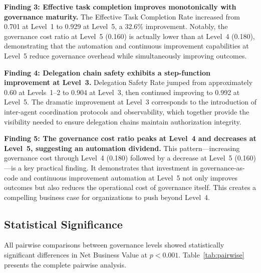 \documentclass[ai,article,submit,pdftex,moreauthors]{Definitions/mdpi}
\begin{document}
\textbf{Finding 3: Effective task completion improves monotonically with governance maturity.} The Effective Task Completion Rate increased from 0.701 at Level~1 to 0.929 at Level~5, a 32.6\% improvement. Notably, the governance cost ratio at Level~5 (0.160) is actually lower than at Level~4 (0.180), demonstrating that the automation and continuous improvement capabilities at Level~5 reduce governance overhead while simultaneously improving outcomes.

\textbf{Finding 4: Delegation chain safety exhibits a step-function improvement at Level~3.} Delegation Safety Rate jumped from approximately 0.60 at Levels~1--2 to 0.904 at Level~3, then continued improving to 0.992 at Level~5. The dramatic improvement at Level~3 corresponds to the introduction of inter-agent coordination protocols and observability, which together provide the visibility needed to ensure delegation chains maintain authorization integrity.

\textbf{Finding 5: The governance cost ratio peaks at Level~4 and decreases at Level~5, suggesting an automation dividend.} This pattern---increasing governance cost through Level~4 (0.180) followed by a decrease at Level~5 (0.160)---is a key practical finding. It demonstrates that investment in governance-as-code and continuous improvement automation at Level~5 not only improves outcomes but also reduces the operational cost of governance itself. This creates a compelling business case for organizations to push beyond Level~4.

\subsection{Statistical Significance}\label{sec:results-stats}

All pairwise comparisons between governance levels showed statistically significant differences in Net Business Value at $p < 0.001$. Table~\ref{tab:pairwise} presents the complete pairwise analysis.
\end{document}
